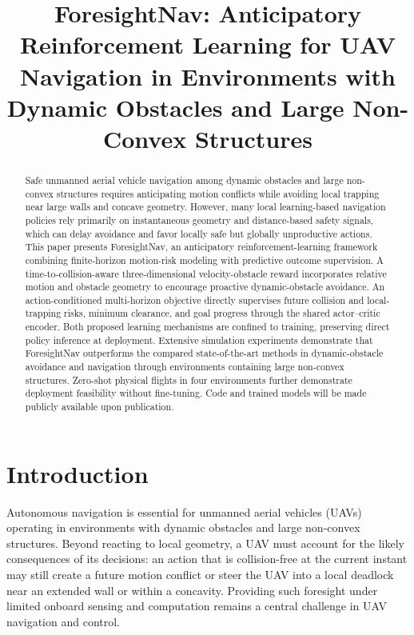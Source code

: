 \documentclass[letterpaper, 10 pt, conference]{ieeeconf}
\title{\LARGE \bf
ForesightNav: Anticipatory Reinforcement Learning for UAV Navigation in Environments with Dynamic Obstacles and Large Non-Convex Structures
}
\begin{document}
\maketitle
\thispagestyle{empty}
\pagestyle{empty}
\begin{abstract}  
			Safe unmanned aerial vehicle navigation among dynamic obstacles and large non-convex structures requires anticipating motion conflicts while avoiding local trapping near large walls and concave geometry. However, many local learning-based navigation policies rely primarily on instantaneous geometry and distance-based safety signals, which can delay avoidance and favor locally safe but globally unproductive actions. This paper presents ForesightNav, an anticipatory reinforcement-learning framework combining finite-horizon motion-risk modeling with predictive outcome supervision. A time-to-collision-aware three-dimensional velocity-obstacle reward incorporates relative motion and obstacle geometry to encourage proactive dynamic-obstacle avoidance. An action-conditioned multi-horizon objective directly supervises future collision and local-trapping risks, minimum clearance, and goal progress through the shared actor--critic encoder. Both proposed learning mechanisms are confined to training, preserving direct policy inference at deployment. Extensive simulation experiments demonstrate that ForesightNav outperforms the compared state-of-the-art methods in dynamic-obstacle avoidance and navigation through environments containing large non-convex structures. Zero-shot physical flights in four environments further demonstrate deployment feasibility without fine-tuning. Code and trained models will be made publicly available upon publication.
\end{abstract}


\section{Introduction}
Autonomous navigation is essential for unmanned aerial vehicles (UAVs) operating in environments with dynamic obstacles and large non-convex structures. Beyond reacting to local geometry, a UAV must account for the likely consequences of its decisions: an action that is collision-free at the current instant may still create a future motion conflict or steer the UAV into a local deadlock near an extended wall or within a concavity. Providing such foresight under limited onboard sensing and computation remains a central challenge in UAV navigation and control.
\end{document}
